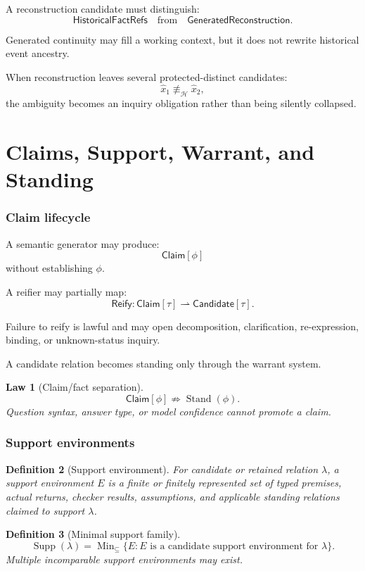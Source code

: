 \documentclass[11pt,oneside]{article}
\newtheorem{definition}{Definition}[section]
\newtheorem{law}[definition]{Law}
\newcommand{\Stand}{\operatorname{Stand}}
\newcommand{\Supp}{\operatorname{Supp}}
\begin{document}
A reconstruction candidate must distinguish:
\[
\boxed{
\mathsf{HistoricalFactRefs}
\quad\text{from}\quad
\mathsf{GeneratedReconstruction}.
}
\]

Generated continuity may fill a working context, but it does not rewrite historical event ancestry.

When reconstruction leaves several protected-distinct candidates:
\[
\widehat x_1\not\equiv_{\mathcal H}\widehat x_2,
\]
the ambiguity becomes an inquiry obligation rather than being silently collapsed.

\part{Claims, Support, Warrant, and Standing}

\section{Claim lifecycle}

A semantic generator may produce:
\[
\boxed{
\mathsf{Claim}[\phi]
}
\]
without establishing \(\phi\).

A reifier may partially map:
\[
\mathsf{Reify}:
\mathsf{Claim}[\tau]
\rightharpoonup
\mathsf{Candidate}[\tau].
\]

Failure to reify is lawful and may open decomposition, clarification, re-expression, binding, or unknown-status inquiry.

A candidate relation becomes standing only through the warrant system.

\begin{law}[Claim/fact separation]
\[
\boxed{
\mathsf{Claim}[\phi]
\not\Rightarrow
\Stand(\phi).
}
\]
Question syntax, answer type, or model confidence cannot promote a claim.
\end{law}

\section{Support environments}

\begin{definition}[Support environment]
For candidate or retained relation \(\lambda\), a support environment \(E\) is a finite or finitely represented set of typed premises, actual returns, checker results, assumptions, and applicable standing relations claimed to support \(\lambda\).
\end{definition}

\begin{definition}[Minimal support family]
\[
\boxed{
\Supp(\lambda)
=
\operatorname{Min}_{\subseteq}
\{
E:
E\text{ is a candidate support environment for }\lambda
\}.
}
\]
Multiple incomparable support environments may exist.
\end{definition}
\end{document}
